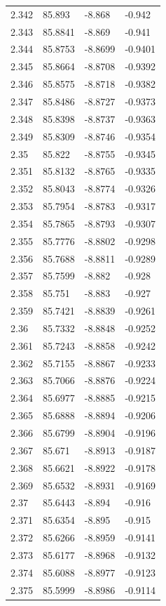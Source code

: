 \begin{tabular}{llll}
2.342 & 85.893 & -8.868 & -0.942 \\
2.343 & 85.8841 & -8.869 & -0.941 \\
2.344 & 85.8753 & -8.8699 & -0.9401 \\
2.345 & 85.8664 & -8.8708 & -0.9392 \\
2.346 & 85.8575 & -8.8718 & -0.9382 \\
2.347 & 85.8486 & -8.8727 & -0.9373 \\
2.348 & 85.8398 & -8.8737 & -0.9363 \\
2.349 & 85.8309 & -8.8746 & -0.9354 \\
2.35 & 85.822 & -8.8755 & -0.9345 \\
2.351 & 85.8132 & -8.8765 & -0.9335 \\
2.352 & 85.8043 & -8.8774 & -0.9326 \\
2.353 & 85.7954 & -8.8783 & -0.9317 \\
2.354 & 85.7865 & -8.8793 & -0.9307 \\
2.355 & 85.7776 & -8.8802 & -0.9298 \\
2.356 & 85.7688 & -8.8811 & -0.9289 \\
2.357 & 85.7599 & -8.882 & -0.928 \\
2.358 & 85.751 & -8.883 & -0.927 \\
2.359 & 85.7421 & -8.8839 & -0.9261 \\
2.36 & 85.7332 & -8.8848 & -0.9252 \\
2.361 & 85.7243 & -8.8858 & -0.9242 \\
2.362 & 85.7155 & -8.8867 & -0.9233 \\
2.363 & 85.7066 & -8.8876 & -0.9224 \\
2.364 & 85.6977 & -8.8885 & -0.9215 \\
2.365 & 85.6888 & -8.8894 & -0.9206 \\
2.366 & 85.6799 & -8.8904 & -0.9196 \\
2.367 & 85.671 & -8.8913 & -0.9187 \\
2.368 & 85.6621 & -8.8922 & -0.9178 \\
2.369 & 85.6532 & -8.8931 & -0.9169 \\
2.37 & 85.6443 & -8.894 & -0.916 \\
2.371 & 85.6354 & -8.895 & -0.915 \\
2.372 & 85.6266 & -8.8959 & -0.9141 \\
2.373 & 85.6177 & -8.8968 & -0.9132 \\
2.374 & 85.6088 & -8.8977 & -0.9123 \\
2.375 & 85.5999 & -8.8986 & -0.9114 \\

\end{tabular}
